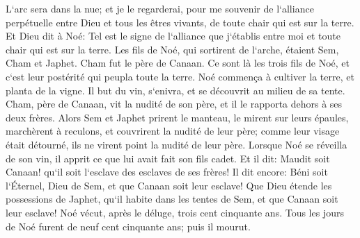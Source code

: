\verse L`arc sera dans la nue; et je le regarderai, pour me souvenir de l`alliance perpétuelle entre Dieu et tous les êtres vivants, de toute chair qui est sur la terre. 
\verse Et Dieu dit à Noé: Tel est le signe de l`alliance que j`établis entre moi et toute chair qui est sur la terre. 
\verse Les fils de Noé, qui sortirent de l`arche, étaient Sem, Cham et Japhet. Cham fut le père de Canaan. 
\verse Ce sont là les trois fils de Noé, et c`est leur postérité qui peupla toute la terre. 
\verse Noé commença à cultiver la terre, et planta de la vigne. 
\verse Il but du vin, s`enivra, et se découvrit au milieu de sa tente. 
\verse Cham, père de Canaan, vit la nudité de son père, et il le rapporta dehors à ses deux frères. 
\verse Alors Sem et Japhet prirent le manteau, le mirent sur leurs épaules, marchèrent à reculons, et couvrirent la nudité de leur père; comme leur visage était détourné, ils ne virent point la nudité de leur père. 
\verse Lorsque Noé se réveilla de son vin, il apprit ce que lui avait fait son fils cadet. 
\verse Et il dit: Maudit soit Canaan! qu`il soit l`esclave des esclaves de ses frères! 
\verse Il dit encore: Béni soit l`Éternel, Dieu de Sem, et que Canaan soit leur esclave! 
\verse Que Dieu étende les possessions de Japhet, qu`il habite dans les tentes de Sem, et que Canaan soit leur esclave! 
\verse Noé vécut, après le déluge, trois cent cinquante ans. 
\verse Tous les jours de Noé furent de neuf cent cinquante ans; puis il mourut. 

